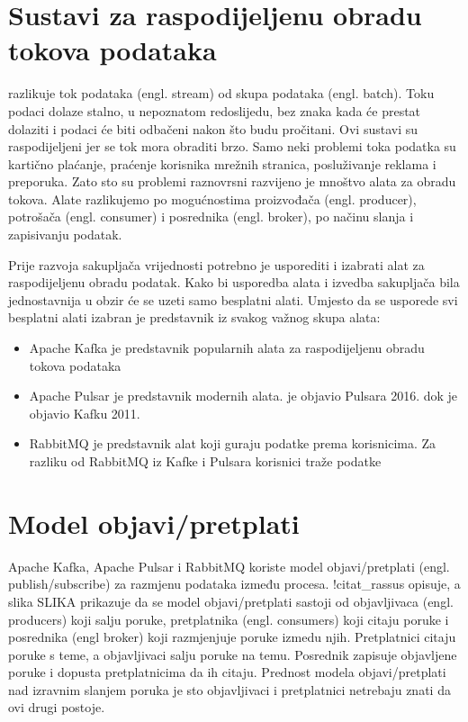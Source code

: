 \documentclass[times, utf8, diplomski, numeric]{fer}
\begin{document}
\chapter{Sustavi za raspodijeljenu obradu tokova podataka}

\citep{ilprints535} razlikuje tok podataka (engl. stream) od skupa podataka (engl. batch). Toku podaci dolaze stalno, u nepoznatom redoslijedu, bez znaka kada će prestat dolaziti i podaci će biti odbačeni nakon što budu pročitani. Ovi sustavi su raspodijeljeni jer se tok mora obraditi brzo. Samo neki problemi toka podatka su kartično plaćanje, praćenje korisnika mrežnih stranica, posluživanje reklama i preporuka. Zato sto su problemi raznovrsni razvijeno je mnoštvo alata za obradu tokova. Alate razlikujemo po mogućnostima proizvođača (engl. producer), potrošača (engl. consumer) i posrednika (engl. broker), po načinu slanja i zapisivanju podatak.

Prije razvoja sakupljača vrijednosti potrebno je usporediti i izabrati alat za raspodijeljenu obradu podatak. Kako bi usporedba alata i izvedba sakupljača bila jednostavnija u obzir će se uzeti samo besplatni alati. Umjesto da se usporede svi besplatni alati izabran je predstavnik iz svakog važnog skupa alata:
\begin{itemize}
  \item Apache Kafka je predstavnik popularnih alata za raspodijeljenu obradu tokova podataka
  \item Apache Pulsar je predstavnik modernih alata. \citep{yahoo-blogpost} je objavio Pulsara 2016. dok je \citep{kafka-whitepaper} objavio Kafku 2011.
  \item RabbitMQ je predstavnik alat koji guraju podatke prema korisnicima. Za razliku od RabbitMQ iz Kafke i Pulsara korisnici traže podatke
\end{itemize}

\chapter{Model objavi/pretplati}
Apache Kafka, Apache Pulsar i RabbitMQ koriste model objavi/pretplati (engl. publish/subscribe) za razmjenu podataka između procesa. !citat_rassus opisuje, a slika SLIKA prikazuje da se model objavi/pretplati sastoji od objavljivaca (engl. producers) koji salju poruke, pretplatnika (engl. consumers) koji citaju poruke i posrednika (engl broker) koji razmjenjuje poruke izmedu njih. Pretplatnici citaju poruke s teme, a objavljivaci salju poruke na temu. Posrednik zapisuje objavljene poruke i dopusta pretplatnicima da ih citaju. Prednost modela objavi/pretplati nad izravnim slanjem poruka je sto objavljivaci i pretplatnici netrebaju znati da ovi drugi postoje. 
\end{document}
